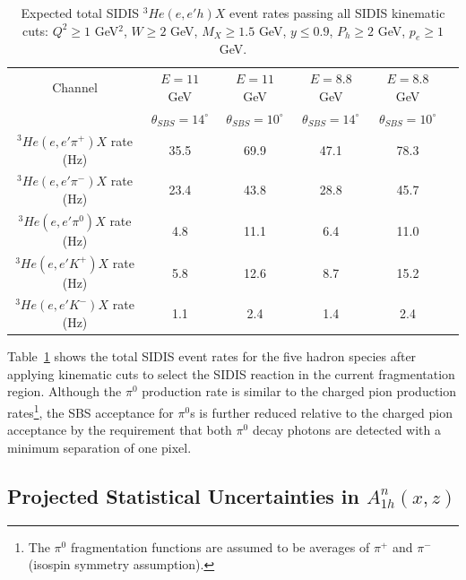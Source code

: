 \begin{table}[h]
  \caption{\label{RateTable} Expected total SIDIS $^3He(e,e'h)X$ event rates passing all SIDIS kinematic cuts: $Q^2 \ge 1$ GeV$^2$, $W \ge 2$ GeV, $M_X \ge 1.5$ GeV, $y \le 0.9$, $P_h \ge 2$ GeV, $p_e \ge 1$ GeV.}
  \begin{center}
    \begin{tabular}{cccccc}
      \hline \hline
      Channel & $E = 11$ GeV & $E = 11$ GeV & $E = 8.8$ GeV & $E=8.8$ GeV \\ 
      & $\theta_{SBS} = 14^\circ$ & $\theta_{SBS}=10^\circ$ & $\theta_{SBS} = 14^\circ$ & $\theta_{SBS} = 10^\circ$ \\ \hline 
      $^3He(e,e'\pi^+)X$ rate (Hz) & 35.5 & 69.9 & 47.1 & 78.3 \\ 
      $^3He(e,e'\pi^-)X$ rate (Hz) & 23.4 & 43.8 & 28.8 & 45.7 \\
      $^3He(e,e'\pi^0)X$ rate (Hz) & 4.8 & 11.1 & 6.4 & 11.0 \\
      $^3He(e,e'K^+)X$ rate (Hz) & 5.8 & 12.6 & 8.7 & 15.2 \\
      $^3He(e,e'K^-)X$ rate (Hz) & 1.1 & 2.4 & 1.4 & 2.4 \\ \hline \hline 
    \end{tabular}
  \end{center}
\end{table}
Table~\ref{RateTable} shows the total SIDIS event rates for the five hadron species after applying kinematic cuts to select the SIDIS reaction in the current fragmentation region. Although the $\pi^0$ production rate is similar to the charged pion production rates\footnote{The $\pi^0$ fragmentation functions are assumed to be averages of $\pi^+$ and $\pi^-$ (isospin symmetry assumption).}, the SBS acceptance for $\pi^0$s is further reduced relative to the charged pion acceptance by the requirement that both $\pi^0$ decay photons are detected with a minimum separation of one pixel.
\subsection{Projected Statistical Uncertainties in $A_{1h}^n(x,z)$}

